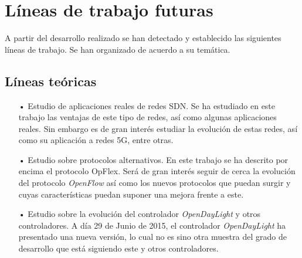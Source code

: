 \documentclass[a4paper,11pt]{book}
\begin{document}
\section{Líneas de trabajo futuras}
A partir del desarrollo realizado se han detectado y establecido las siguientes líneas de trabajo. Se han organizado de acuerdo a su temática.

\subsection{Líneas teóricas}
\begin{itemize}
\item[•] Estudio de aplicaciones reales de redes \ac{SDN}. Se ha estudiado en este trabajo las ventajas de este tipo de redes, así como algunas aplicaciones reales. Sin embargo es de gran interés estudiar la evolución de estas redes, así como su aplicación a redes 5G, entre otras.
\item[•] Estudio sobre protocolos alternativos. En este trabajo se ha descrito por encima el protocolo OpFlex. Será de gran interés seguir de cerca la evolución del protocolo \emph{OpenFlow} así como los nuevos protocolos que puedan surgir y cuyas características puedan suponer una mejora frente a este.
\item[•] Estudio sobre la evolución del controlador \emph{OpenDayLight} y otros controladores. A día 29 de Junio de 2015, el controlador \emph{OpenDayLight} ha presentado una nueva versión, lo cual no es sino otra muestra del grado de desarrollo que está siguiendo este y otros controladores.
\end{itemize}
\end{document}
